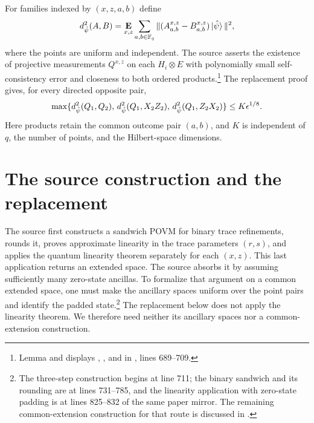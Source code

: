 \documentclass[11pt]{article}
\begin{document}
For families indexed by $(x,z,a,b)$ define
\[
 d_{\hat\psi}^2(A,B)
 =\mathop{\bf E\/}_{x,z}\sum_{a,b\in\mathbb{F}_q}
       \|(A^{x,z}_{a,b}-B^{x,z}_{a,b})\ket{\hat\psi}\|^2,
\]
where the points are uniform and independent.  The source asserts the
existence of projective measurements $Q^{x,z}$ on each $H_i\otimes E$ with
polynomially small self-consistency error and closeness to both ordered
products.\footnote{Lemma  and displays
, , and
 in
,
lines 689--709.}
The replacement proof gives, for every directed opposite pair,
\begin{equation}\label{eq:target}
 \max\{d_{\hat\psi}^2(Q_1,Q_2),\,
        d_{\hat\psi}^2(Q_1,X_2Z_2),\,
        d_{\hat\psi}^2(Q_1,Z_2X_2)\}
 \leq K\epsilon^{1/8}.
\end{equation}
Here products retain the common outcome pair $(a,b)$, and $K$ is independent
of $q$, the number of points, and the Hilbert-space dimensions.

\section{The source construction and the replacement}

The source first constructs a sandwich POVM for binary trace refinements,
rounds it, proves approximate linearity in the trace parameters $(r,s)$,
and applies the quantum linearity theorem separately for each $(x,z)$.
This last application returns an extended space.  The source absorbs it by
assuming sufficiently many zero-state ancillas.  To formalize that argument
on a common extended space, one must make the ancillary spaces uniform over
the point pairs and identify the padded state.\footnote{The three-step
construction begins at line 711; the binary sandwich and its rounding are
at lines 731--785, and the linearity application with zero-state padding is
at lines 825--832 of the same paper mirror.  The remaining common-extension
construction for that route is discussed in
.}
The replacement below does not apply the linearity theorem.  We therefore
need neither its ancillary spaces nor a common-extension construction.
\end{document}
